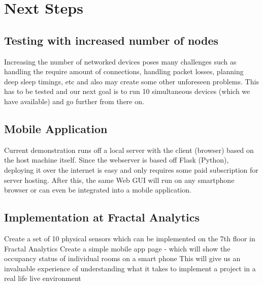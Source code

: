 \chapter{Next Steps}
\section{Testing with increased number of nodes}
Increasing the number of networked devices poses many challenges such as handling the require amount of connections, handling packet losses, planning deep sleep timings, etc and also may create some other unforeseen problems. This has to be tested and our next goal is to run 10 simultaneous devices (which we have available) and go further from there on.

\section{Mobile Application}
Current demonstration runs off a local server with the client (browser) based on the host machine itself. Since the webserver is based off Flask (Python), deploying it over the internet is easy and only requires some paid subscription for server hosting. After this, the same Web GUI will run on any smartphone browser or can even be integrated into a mobile application.      

\section{Implementation at Fractal Analytics}
Create a set of 10 physical sensors which can be implemented on the 7th floor in Fractal Analytics
Create a simple mobile app page - which will show the occupancy status of individual rooms on a smart phone
This will give us an invaluable experience of understanding what it takes to implement a project in a real life live environment